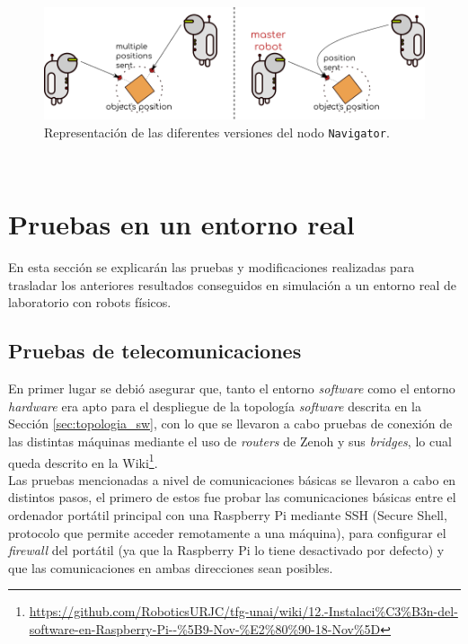 \begin{figure} [h!]
  \begin{center}
    \includegraphics[width=15cm]{figs/navigator_versions}
  \end{center}
  \caption{Representación de las diferentes versiones del nodo \texttt{Navigator}.}
  \label{fig:navigator_versions}
\end{figure}\



\section{Pruebas en un entorno real}
\label{sec:pruebas_real}

En esta sección se explicarán las pruebas y modificaciones realizadas para
trasladar los anteriores resultados conseguidos en simulación a un entorno real
de laboratorio con robots físicos.
\\

\subsection{Pruebas de telecomunicaciones}
\label{sec:pruebas_telecoms}

En primer lugar se debió asegurar que, tanto el entorno \textit{software} como
el entorno \textit{hardware} era apto para el despliegue de la topología
\textit{software} descrita en la Sección \ref{sec:topologia_sw}, con lo que se
llevaron a cabo pruebas de conexión de las distintas máquinas mediante el uso de
\textit{routers} de Zenoh y sus \textit{bridges}, lo cual queda descrito en la
Wiki\footnote{
\url{https://github.com/RoboticsURJC/tfg-unai/wiki/12.-Instalaci\%C3\%B3n-del-software-en-Raspberry-Pi--\%5B9-Nov-\%E2\%80\%90-18-Nov\%5D}}.
\\

Las pruebas mencionadas a nivel de comunicaciones básicas se llevaron a cabo
en distintos pasos, el primero de estos fue probar las comunicaciones básicas
entre el ordenador portátil principal con una Raspberry Pi mediante SSH (Secure
Shell, protocolo que permite acceder remotamente a una máquina), para configurar
el \textit{firewall} del portátil (ya que la Raspberry Pi lo tiene desactivado por
defecto) y que las comunicaciones en ambas direcciones sean posibles.
\\

